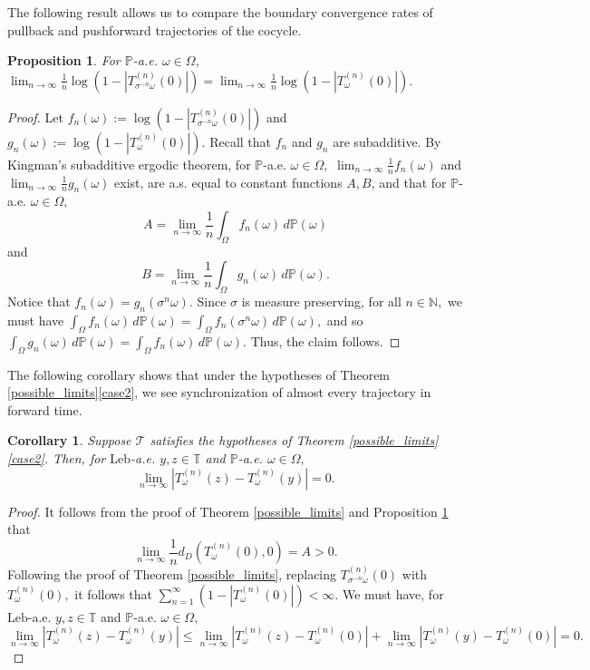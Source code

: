 \documentclass[12pt,reqno]{amsart}
\newcommand{\pw}{\mathbb{P}(\omega)}
\numberwithin{theorem}{section}
\newtheorem{proposition}[theorem]{Proposition}%
\newtheorem{corollary}[theorem]{Corollary}
\begin{document}
The following result allows us to compare the boundary convergence rates of pullback and pushforward trajectories of the cocycle.
\begin{proposition}\label{push_pull_equiv}
    For $\mathbb{P}$-a.e. $\omega\in\Omega$, $\lim_{n\to\infty}\frac{1}{n}\log(1-|T_{\sigma^{-n}\omega}^{(n)}(0)|)=\lim_{n\to\infty}\frac{1}{n}\log(1-|T_{\omega}^{(n)}(0)|).$
\end{proposition}
\begin{proof}
    Let $f_{n}(\omega):=\log(1-|T_{\sigma^{-n}\omega}^{(n)}(0)|)$ and $g_{n}(\omega):=\log(1-|T_{\omega}^{(n)}(0)|).$ Recall that $f_{n}$ and $g_n$ are subadditive. By Kingman's subadditive ergodic theorem, for $\mathbb{P}$-a.e. $\omega\in\Omega,$ $\lim_{n\to\infty}\frac{1}{n}f_{n}(\omega)$ and $\lim_{n\to\infty}\frac{1}{n}g_{n}(\omega)$ exist, are a.s. equal to constant functions $A, B$, and that for $\mathbb{P}$-a.e. $\omega\in\Omega,$ $$A=\lim_{n\to\infty}\frac{1}{n}\int_{\Omega}f_{n}(\omega)\,d\pw$$ and $$B=\lim_{n\to\infty}\frac{1}{n}\int_{\Omega}g_{n}(\omega)\,d\pw.$$ 
    Notice that $f_{n}(\omega)=g_{n}(\sigma^{n}\omega).$ Since $\sigma$ is measure preserving, for all $n\in\mathbb{N},$ we must have $\int_{\Omega}f_{n}(\omega)\,d\mathbb{P}(\omega)=\int_{\Omega}f_{n}(\sigma^{n}\omega)\,d\mathbb{P}(\omega),$ and so $\int_{\Omega}g_{n}(\omega)\,d\mathbb{P}(\omega)=\int_{\Omega}f_{n}(\omega)\,d\mathbb{P}(\omega).$ Thus, the claim follows.
\end{proof}

The following corollary shows that under the hypotheses of Theorem \ref{possible_limits}\ref{case2}, we see  synchronization of almost every trajectory in forward time.
\begin{corollary}\label{push_pull_equiv_limit}
    Suppose $\mathcal{T}$ satisfies the hypotheses of Theorem \ref{possible_limits}\ref{case2}. Then, for $\text{Leb}$-a.e. $y, z\in\mathbb{T}$ and $\mathbb{P}$-a.e. $\omega\in\Omega,$ $$\lim_{n\to\infty}|T_{\omega}^{(n)}(z)-T_{\omega}^{(n)}(y)|=0.$$
\end{corollary}
\begin{proof}
    It follows from the proof of Theorem \ref{possible_limits} and Proposition \ref{push_pull_equiv} that $$\lim_{n\to\infty}\frac{1}{n}d_{D}(T_{\omega}^{(n)}(0),0)=A>0.$$ Following the proof of Theorem \ref{possible_limits}, replacing $T_{\sigma^{-n}\omega}^{(n)}(0)$ with $T_{\omega}^{(n)}(0),$ it follows that $\sum_{n=1}^{\infty}(1-|T_{\omega}^{(n)}(0)|)<\infty.$ We must have, for $\text{Leb}$-a.e. $y,z\in\mathbb{T}$ and $\mathbb{P}$-a.e. $\omega\in\Omega,$ $$\lim_{n\to\infty}|T_{\omega}^{(n)}(z)-T_{\omega}^{(n)}(y)|\le\lim_{n\to\infty}|T_{\omega}^{(n)}(z)-T_{\omega}^{(n)}(0)|+\lim_{n\to\infty}|T_{\omega}^{(n)}(y)-T_{\omega}^{(n)}(0)|=0.$$ 
\end{proof}
\end{document}
